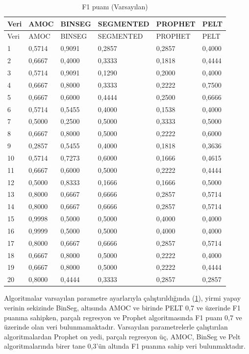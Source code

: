\documentclass[12pt,twoside]{deuthesis}
\begin{document}
\begin{longtable}[]{@{}llllll@{}}
\caption{\label{tab:nvar8} F1 puanı (Varsayılan)}\tabularnewline
\toprule
Veri & AMOC & BINSEG & SEGMENTED & PROPHET & PELT\tabularnewline
\midrule
\endfirsthead
\toprule
Veri & AMOC & BINSEG & SEGMENTED & PROPHET & PELT\tabularnewline
\midrule
\endhead
1 & 0,5714 & 0,9091 & 0,2857 & 0,2857 & 0,4000\tabularnewline
2 & 0,6667 & 0,4000 & 0,3333 & 0,1818 & 0,4444\tabularnewline
3 & 0,5714 & 0,9091 & 0,1290 & 0,2000 & 0,4000\tabularnewline
4 & 0,6667 & 0,8000 & 0,3333 & 0,2222 & 0,7500\tabularnewline
5 & 0,6667 & 0,6000 & 0,4444 & 0,2500 & 0,6666\tabularnewline
6 & 0,5714 & 0,5455 & 0,4000 & 0,1538 & 0,4000\tabularnewline
7 & 0,5000 & 0,2500 & 0,5000 & 0,3333 & 0,5000\tabularnewline
8 & 0,6667 & 0,8000 & 0,5000 & 0,2222 & 0,6000\tabularnewline
9 & 0,2857 & 0,5455 & 0,4000 & 0,1818 & 0,3636\tabularnewline
10 & 0,5714 & 0,7273 & 0,6000 & 0,1666 & 0,4615\tabularnewline
11 & 0,6667 & 0,6000 & 0,5000 & 0,2222 & 0,4444\tabularnewline
12 & 0,5000 & 0,8333 & 0,1666 & 0,1666 & 0,5000\tabularnewline
13 & 0,8000 & 0,6667 & 0,6666 & 0,2857 & 0,5714\tabularnewline
14 & 0,8000 & 0,6667 & 0,6666 & 0,2857 & 0,5714\tabularnewline
15 & 0,9998 & 0,5000 & 0,5000 & 0,4000 & 0,4000\tabularnewline
16 & 0,9999 & 0,5000 & 0,5000 & 0,4000 & 0,4000\tabularnewline
17 & 0,8000 & 0,6667 & 0,6666 & 0,2857 & 0,5714\tabularnewline
18 & 0,6667 & 0,8000 & 0,5000 & 0,2222 & 0,4000\tabularnewline
19 & 0,6667 & 0,8000 & 0,5000 & 0,2222 & 0,4444\tabularnewline
20 & 0,8000 & 0,4444 & 0,3333 & 0,2857 & 0,2857\tabularnewline
\bottomrule
\end{longtable}

Algoritmalar varsayılan parametre ayarlarıyla çalıştırıldığında (\ref{tab:nvar8}), yirmi yapay verinin sekizinde BinSeg, altısında AMOC ve birinde PELT 0,7 ve üzerinde F1 puanına sahipken, parçalı regresyon ve Prophet algoritmasında F1 puanı 0,7 ve üzerinde olan veri bulunmamaktadır.
Varsayılan parametrelerle çalıştırılan algoritmalardan Prophet on yedi, parçalı regresyon üç, AMOC, BinSeg ve Pelt algoritmalarında birer tane 0,3'ün altında F1 puanına sahip veri bulunmaktadır.
\end{document}
